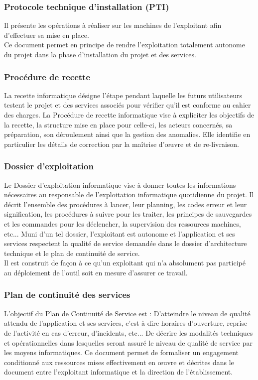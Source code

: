 \documentclass[11pt,fleqn]{book} %
\begin{document}
\subsubsection{Protocole technique d'installation (PTI)}
Il présente les opérations à réaliser sur les machines de l'exploitant afin d'effectuer sa mise en place.
\\
Ce document permet en principe de rendre l'exploitation totalement autonome du projet dans la phase d'installation du projet et des services.

\subsubsection{Procédure de recette}
La recette informatique désigne l'étape pendant laquelle les futurs utilisateurs testent le projet et des services associés pour vérifier qu'il est conforme au cahier des charges.
La Procédure de recette informatique vise à expliciter les objectifs de la recette, la structure mise en place pour celle-ci, les acteurs concernés, sa préparation, son déroulement ainsi que la gestion des anomalies. Elle identifie en particulier les détails de correction par la maîtrise d'œuvre et de re-livraison.

\subsubsection{Dossier d'exploitation}
Le Dossier d'exploitation informatique vise à donner toutes les informations nécessaires au responsable de l'exploitation informatique quotidienne du projet. Il décrit l'ensemble des procédures à lancer, leur planning, les codes erreur et leur signification, les procédures à suivre pour les traiter, les principes de sauvegardes et les commandes pour les déclencher, la supervision des ressources machines, etc... Muni d'un tel dossier, l'exploitant est autonome et l'application et ses services respectent la qualité de service demandée dans le dossier d'architecture technique et le plan de continuité de service.
\\
Il est construit de façon à ce qu'un exploitant qui n'a absolument pas participé au déploiement de l'outil soit en mesure d'assurer ce travail.

\subsubsection{Plan de continuité des services}
L'objectif du Plan de Continuité de Service est :
D'atteindre le niveau de qualité attendu de l'application et ses services, c'est à dire horaires d'ouverture, reprise de l'activité en cas d'erreur, d'incidents, etc...
De décrire les modalités techniques et opérationnelles dans lesquelles seront assuré le niveau de qualité de service par les moyens informatiques.
Ce document permet de formaliser un engagement conditionné aux ressources mises effectivement en œuvre et décrites dans le document entre l'exploitant informatique et la direction de l'établissement.
\end{document}
